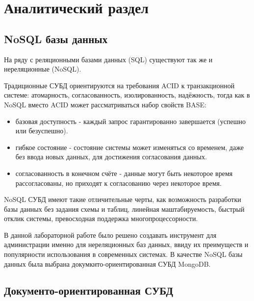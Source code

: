 \section{Аналитический раздел}


\subsection{NoSQL базы данных}

На ряду с реляционными базами данных (SQL) существуют так же и нереляционные (NoSQL).
\par
Традиционные СУБД ориентируются на требования ACID к транзакционной системе: атомарность, согласованность, изолированность, надёжность, тогда как в NoSQL вместо ACID может рассматриваться набор свойств BASE:

\begin{itemize}
    \item базовая доступность - каждый запрос гарантированно завершается (успешно или безуспешно).
    \item гибкое состояние - состояние системы может изменяться со временем, даже без ввода новых данных, для достижения согласования данных.
    \item согласованность в конечном счёте - данные могут быть некоторое время рассогласованы, но приходят к согласованию через некоторое время.
\end{itemize}

\par
NoSQL СУБД имеют такие отличительные черты, как возможность разработки базы данных без задания схемы и таблиц, линейная маштабируемость, быстрый отклик системы, превосходная поддержка многопроцессорности.
\par
В данной лабораторной работе было решено создавать инструмент для администрации именно для нереляционных баз данных, ввиду их преимуществ и популярности использования в современных системах. В качестве NoSQL базы данных была выбрана докумкнто-ориентированная СУБД MongoDB.


\subsection{Документо-ориентированная СУБД}

